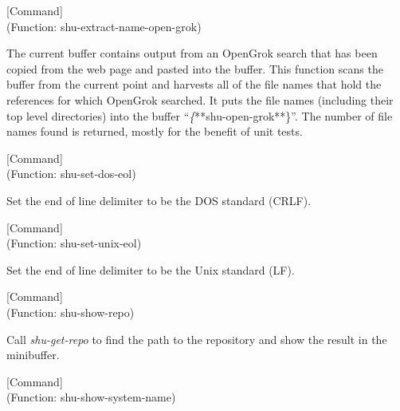 \vspace{1em}
\noindent
{}
\usebox{\funcname}
 \hfill [Command]\\%
 (Function: shu-extract-name-open-grok)

\begin{doc-string}
The current buffer contains output from an OpenGrok search that has been
copied from the web page and pasted into the buffer.  This function scans the
buffer from the current point and harvests all of the file names that hold the
references for which OpenGrok searched.  It puts the file names (including their
top level directories) into the buffer ``\emph\{**shu-open-grok**\}''.
The number of file names found is returned, mostly for the benefit of unit
tests.
\end{doc-string}

\vspace{1em}
\noindent
{}
\usebox{\funcname}
 \hfill [Command]\\%
 (Function: shu-set-dos-eol)

\begin{doc-string}
Set the end of line delimiter to be the DOS standard (CRLF).
\end{doc-string}

\vspace{1em}
\noindent
{}
\usebox{\funcname}
 \hfill [Command]\\%
 (Function: shu-set-unix-eol)

\begin{doc-string}
Set the end of line delimiter to be the Unix standard (LF).
\end{doc-string}

\vspace{1em}
\noindent
{}
\usebox{\funcname}
 \hfill [Command]\\%
 (Function: shu-show-repo)

\begin{doc-string}
Call \emph{shu-get-repo} to find the path to the repository and show the result in
the minibuffer.
\end{doc-string}

\vspace{1em}
\noindent
{}
\usebox{\funcname}
 \hfill [Command]\\%
 (Function: shu-show-system-name)

